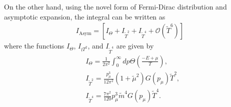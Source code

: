 \documentclass[sn-mathphys,Numbered]{sn-jnl}
\newcommand{\wt}[1]{\widetilde{#1}}
\begin{document}
On the other hand, using the novel form of Fermi-Dirac distribution and asymptotic expansion, the  integral can be written as
\begin{align}\label{lnZ_Sum}
I_{\mathrm{Asym}}=\left[I_{\Theta}+I_{\wt{T}^2}+I_{\wt{T}^4}+\mathcal{O}(\wt{T}^6)\right]
\end{align}
where the functions $I_\Theta$, $I_{\wr{T}^2}$, and $I_{\wt{T}^4}$ are given by
\begin{align}
&I_\Theta=\frac{1}{2\pi^2}\int^{\infty}_{0}\!\!dp\Theta\left(\frac{-E+\mu}{T}\right),\\
&I_{\wt{T}^2}=\frac{p_\mu^3}{12\pi^2}(1 + \wt{\mu}^2)G(p_{\mu})\wt{T}^2,\\
&I_{\wt{T}^4}=\frac{7\pi^2}{120}p_\mu^3\wt{m}^4 G(p_{\mu})\wt{T}^4.
\end{align}
\end{document}
